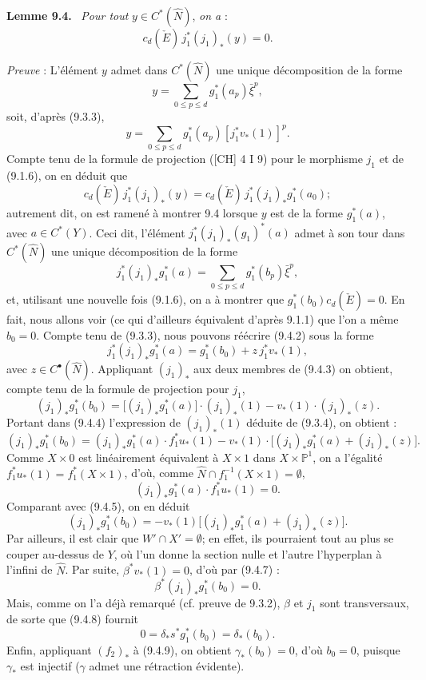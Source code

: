 \documentclass[11pt]{article}
\newenvironment{statement}[1]{\par\medskip\noindent\textbf{#1.}\ }{\par\medskip}
\begin{document}
\begin{statement}{Lemme 9.4}
\emph{Pour tout} $y\in C^*(\widehat N)$, \emph{on a} :
\[
c_d(\check E)\,j_1^*(j_1)_*(y)=0.
\]
\end{statement}

\emph{Preuve} : L'élément $y$ admet dans $C^*(\widehat N)$ une unique décomposition de la forme
\[
y=\sum_{0\le p\le d}g_1^*(a_p)\bar\xi^p,
\]
soit, d'après (9.3.3),
\[
y=\sum_{0\le p\le d}g_1^*(a_p)[j_1^*v_*(1)]^p.
\tag{9.4.1}
\]
Compte tenu de la formule de projection ([CH] 4 I 9) pour le morphisme $j_1$ et de (9.1.6), on en déduit que
\[
c_d(\check E)\,j_1^*(j_1)_*(y)=c_d(\check E)\,j_1^*(j_1)_*g_1^*(a_0);
\]
autrement dit, on est ramené à montrer 9.4 lorsque $y$ est de la forme $g_1^*(a)$, avec $a\in C^*(Y)$. Ceci dit, l'élément $j_1^*(j_1)_*(g_1)^*(a)$ admet à son tour dans $C^*(\widehat N)$ une unique décomposition de la forme
\[
j_1^*(j_1)_*g_1^*(a)=\sum_{0\le p\le d}g_1^*(b_p)\bar\xi^p,
\tag{9.4.2}
\]
et,
utilisant une nouvelle fois (9.1.6), on a à montrer que $g_1^*(b_0)c_d(\check E)=0$. En fait, nous allons voir (ce qui d'ailleurs équivalent d'après 9.1.1) que l'on a même $b_0=0$. Compte tenu de (9.3.3), nous pouvons réécrire (9.4.2) sous la forme
\[
j_1^*(j_1)_*g_1^*(a)=g_1^*(b_0)+z\,j_1^*v_*(1),
\tag{9.4.3}
\]
avec $z\in C^{\bullet}(\widehat N)$. Appliquant $(j_1)_*$ aux deux membres de (9.4.3) on obtient, compte tenu de la formule de projection pour $j_1$,
\[
(j_1)_*g_1^*(b_0)=\bigl[(j_1)_*g_1^*(a)\bigr]\cdot(j_1)_*(1)-v_*(1)\cdot(j_1)_*(z).
\tag{9.4.4}
\]
Portant dans (9.4.4) l'expression de $(j_1)_*(1)$ déduite de (9.3.4), on obtient :
\[
(j_1)_*g_1^*(b_0)=
(j_1)_*g_1^*(a)\cdot f_1^*u_*(1)-v_*(1)\cdot\bigl[(j_1)_*g_1^*(a)+(j_1)_*(z)\bigr].
\tag{9.4.5}
\]
Comme $X\times0$ est linéairement équivalent à $X\times1$ dans $X\times\mathbb P^1$, on a l'égalité $f_1^*u_*(1)=f_1^*(X\times1)$, d'où, comme $\widehat N\cap f_1^{-1}(X\times1)=\emptyset$,
\[
(j_1)_*g_1^*(a)\cdot f_1^*u_*(1)=0.
\tag{9.4.6}
\]
Comparant avec (9.4.5), on en déduit
\[
(j_1)_*g_1^*(b_0)=-v_*(1)\bigl[(j_1)_*g_1^*(a)+(j_1)_*(z)\bigr].
\tag{9.4.7}
\]
Par ailleurs, il est clair que $W'\cap X'=\emptyset$; en effet, ils pourraient tout au plus se couper au-dessus de $Y$, où l'un donne la section nulle et l'autre l'hyperplan à l'infini de $\widehat N$. Par suite, $\beta^*v_*(1)=0$, d'où par (9.4.7) :
\[
\beta^*(j_1)_*g_1^*(b_0)=0.
\tag{9.4.8}
\]
Mais, comme on l'a déjà remarqué (cf. preuve de 9.3.2), $\beta$ et $j_1$ sont transversaux, de sorte que (9.4.8) fournit
\[
0=\delta_*s^*g_1^*(b_0)=\delta_*(b_0).
\tag{9.4.9}
\]
Enfin,
appliquant $(f_2)_*$ à (9.4.9), on obtient $\gamma_*(b_0)=0$, d'où $b_0=0$, puisque $\gamma_*$ est injectif ($\gamma$ admet une rétraction évidente).
\end{document}
